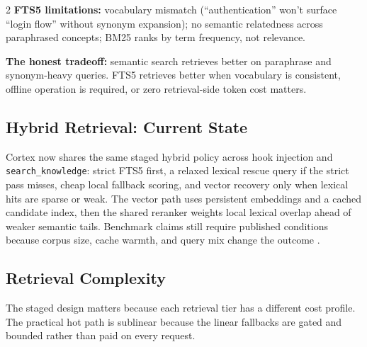 \documentclass[10pt]{article}
\begin{document}
\begin{multicols}{2}
\textbf{FTS5 limitations:} vocabulary mismatch (``authentication'' won't surface ``login flow'' without synonym expansion); no semantic relatedness across paraphrased concepts; BM25 ranks by term frequency, not relevance.

\textbf{The honest tradeoff:} semantic search retrieves better on paraphrase and synonym-heavy queries. FTS5 retrieves better when vocabulary is consistent, offline operation is required, or zero retrieval-side token cost matters.

\subsection{Hybrid Retrieval: Current State}
\label{sec:hybrid}

Cortex now shares the same staged hybrid policy across hook injection and \texttt{search\_knowledge}: strict FTS5 first, a relaxed lexical rescue query if the strict pass misses, cheap local fallback scoring, and vector recovery only when lexical hits are sparse or weak. The vector path uses persistent embeddings and a cached candidate index, then the shared reranker weights local lexical overlap ahead of weaker semantic tails. Benchmark claims still require published conditions because corpus size, cache warmth, and query mix change the outcome \cite{cortex-bench}.

\subsection{Retrieval Complexity}

The staged design matters because each retrieval tier has a different cost profile. The practical hot path is sublinear because the linear fallbacks are gated and bounded rather than paid on every request.


\end{multicols}
\end{document}

